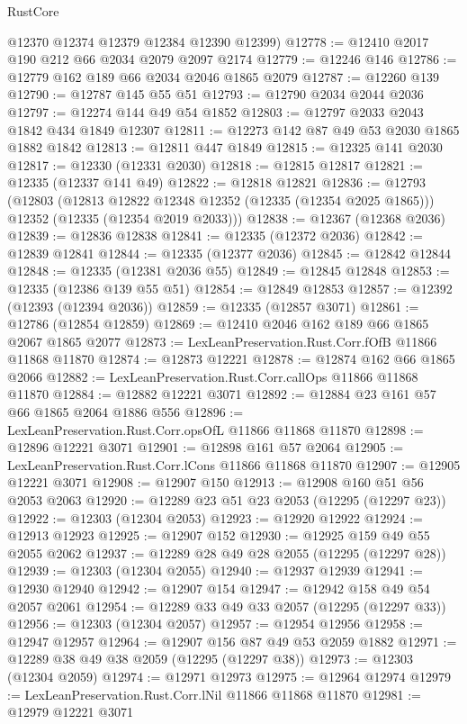 \begin{lexlean}{RustCore}
\begin{coremodule}
      @12370
      @12374
      @12379
      @12384
      @12390
      @12399)
@12778 := @12410 @2017 @190 @212 @66 @2034 @2079 @2097 @2174
@12779 := @12246 @146
@12786 := @12779 @162 @189 @66 @2034 @2046 @1865 @2079
@12787 := @12260 @139
@12790 := @12787 @145 @55 @51
@12793 := @12790 @2034 @2044 @2036
@12797 := @12274 @144 @49 @54 @1852
@12803 := @12797 @2033 @2043 @1842 @434 @1849 @12307
@12811 := @12273 @142 @87 @49 @53 @2030 @1865 @1882 @1842
@12813 := @12811 @447 @1849
@12815 := @12325 @141 @2030
@12817 := @12330 (@12331 @2030)
@12818 := @12815 @12817
@12821 := @12335 (@12337 @141 @49)
@12822 := @12818 @12821
@12836 := @12793
    (@12803
      (@12813 @12822 @12348 @12352 (@12335 (@12354 @2025 @1865)))
      @12352
      (@12335 (@12354 @2019 @2033)))
@12838 := @12367 (@12368 @2036)
@12839 := @12836 @12838
@12841 := @12335 (@12372 @2036)
@12842 := @12839 @12841
@12844 := @12335 (@12377 @2036)
@12845 := @12842 @12844
@12848 := @12335 (@12381 @2036 @55)
@12849 := @12845 @12848
@12853 := @12335 (@12386 @139 @55 @51)
@12854 := @12849 @12853
@12857 := @12392 (@12393 (@12394 @2036))
@12859 := @12335 (@12857 @3071)
@12861 := @12786 (@12854 @12859)
@12869 := @12410 @2046 @162 @189 @66 @1865 @2067 @1865 @2077
@12873 := LexLeanPreservation.Rust.Corr.fOfB @11866 @11868 @11870
@12874 := @12873 @12221
@12878 := @12874 @162 @66 @1865 @2066
@12882 := LexLeanPreservation.Rust.Corr.callOps @11866 @11868 @11870
@12884 := @12882 @12221 @3071
@12892 := @12884 @23 @161 @57 @66 @1865 @2064 @1886 @556
@12896 := LexLeanPreservation.Rust.Corr.opsOfL @11866 @11868 @11870
@12898 := @12896 @12221 @3071
@12901 := @12898 @161 @57 @2064
@12905 := LexLeanPreservation.Rust.Corr.lCons @11866 @11868 @11870
@12907 := @12905 @12221 @3071
@12908 := @12907 @150
@12913 := @12908 @160 @51 @56 @2053 @2063
@12920 := @12289 @23 @51 @23 @2053 (@12295 (@12297 @23))
@12922 := @12303 (@12304 @2053)
@12923 := @12920 @12922
@12924 := @12913 @12923
@12925 := @12907 @152
@12930 := @12925 @159 @49 @55 @2055 @2062
@12937 := @12289 @28 @49 @28 @2055 (@12295 (@12297 @28))
@12939 := @12303 (@12304 @2055)
@12940 := @12937 @12939
@12941 := @12930 @12940
@12942 := @12907 @154
@12947 := @12942 @158 @49 @54 @2057 @2061
@12954 := @12289 @33 @49 @33 @2057 (@12295 (@12297 @33))
@12956 := @12303 (@12304 @2057)
@12957 := @12954 @12956
@12958 := @12947 @12957
@12964 := @12907 @156 @87 @49 @53 @2059 @1882
@12971 := @12289 @38 @49 @38 @2059 (@12295 (@12297 @38))
@12973 := @12303 (@12304 @2059)
@12974 := @12971 @12973
@12975 := @12964 @12974
@12979 := LexLeanPreservation.Rust.Corr.lNil @11866 @11868 @11870
@12981 := @12979 @12221 @3071

\end{coremodule}
\end{lexlean}
